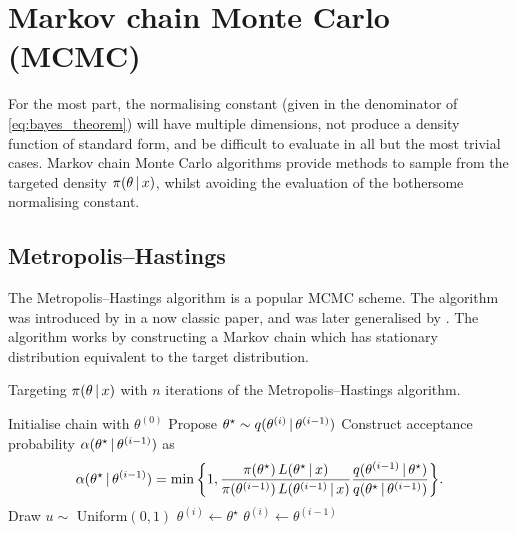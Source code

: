 \section{Markov chain Monte Carlo (MCMC)}
\label{sec:mcmc}

For the most part, the normalising constant (given in the denominator of
\cref{eq:bayes_theorem}) will have multiple dimensions, not produce a density
function of standard form, and be difficult to evaluate in all but the most
trivial cases. Markov chain Monte Carlo algorithms provide methods to sample
from the targeted density $\pi(\theta \,|\, x)$, whilst avoiding the
evaluation of the bothersome normalising constant.

\subsection{Metropolis--Hastings}
\label{ssec:metropolis_hastings}

The Metropolis--Hastings algorithm is a popular MCMC scheme. The algorithm was
introduced by \textcite{metropolis53} in a now classic paper, and was later
generalised by \textcite{hastings70}. The algorithm works by constructing a
Markov chain which has stationary distribution equivalent to the target
distribution.

\begin{algorithm}
  \caption{Targeting $\pi(\theta \,|\, x)$ with $n$ iterations of the
    Metropolis--Hastings algorithm.}
  \label{alg:metropolis_hastings}
  \begin{algorithmic}[1]
    \State Initialise chain with $\theta^{(0)}$
      \State Propose ${\theta}^\star \sim q(\theta^{(i)} \,|\, \theta^{(i-1)})$
      \State Construct acceptance probability $\alpha(\theta^\star \,|\, \theta^{(i-1)})$ as
      \begin{equation*}
          \alpha(\theta^\star \given \theta^{(i-1)}) =
        \min\bigg\{1,
        \frac{\pi(\theta^\star) \, L(\theta^\star \given  x)}%
        {\pi(\theta^{(i-1)}) \, L(\theta^{(i-1)} \given  x)}
        \frac{q(\theta^{(i-1)} \given \theta^\star)}%
        {q(\theta^\star \given \theta^{(i-1)})}
        \bigg\}.
      \end{equation*}
      \State Draw $u \sim$ Uniform$(0, 1)$
        \State {}
        \State $\theta^{(i)} \leftarrow \theta^\star$
      \Else
        \State {}
        \State $\theta^{(i)} \leftarrow \theta^{(i-1)}$
      \EndIf
    \EndFor
  \end{algorithmic}
\end{algorithm}

